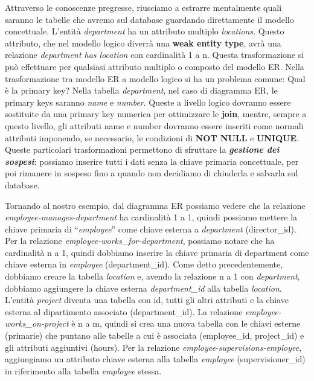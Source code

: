 Attraverso le conoscenze pregresse, riusciamo a estrarre mentalmente quali saranno le tabelle che avremo sul database guardando direttamente il modello concettuale.  
L’entità \textit{department} ha un attributo multiplo \textit{locations}. Questo attributo, che nel modello logico diverrà una \textbf{weak entity type}, avrà una relazione \textit{department has location} con cardinalità 1 a n. Questa trasformazione si può effettuare per qualsiasi attributo multiplo o composto del modello ER. Nella trasformazione tra modello ER a modello logico si ha un problema comune:  Qual è la primary key?  Nella tabella \textit{department}, nel caso di diagramma ER, le primary keys saranno \textit{name} e \textit{number}. Queste a livello logico dovranno essere sostituite da una primary key numerica per ottimizzare le \textbf{join}, mentre, sempre a questo livello, gli attributi name e number dovranno essere inseriti come normali attributi imponendo, se necessario, le condizioni di \textbf{NOT NULL} e \textbf{UNIQUE}. Queste particolari trasformazioni permettono di sfruttare la \textit{\textbf{gestione dei sospesi}}: possiamo inserire tutti i dati senza la chiave primaria concettuale, per poi rimanere in sospeso fino a quando non decidiamo di chiuderla e salvarla sul database.  

Tornando al nostro esempio, dal diagramma ER possiamo vedere che la relazione \textit{employee-manages-department} ha cardinalità 1 a 1, quindi possiamo mettere la chiave primaria di “\textit{employee}” come chiave esterna a \textit{department} (director\_id). Per la relazione \textit{employee-works\_for-department}, possiamo notare che ha cardinalità n a 1, quindi dobbiamo inserire la chiave primaria di department come chiave esterna in \textit{employee} (department\_id). Come detto precedentemente, dobbiamo creare la tabella \textit{location} e, avendo la relazione n a 1 con \textit{department}, dobbiamo aggiungere la chiave esterna \textit{department\_id} alla tabella \textit{location}. L’entità \textit{project} diventa una tabella con id, tutti gli altri attributi e la chiave esterna al dipartimento associato (department\_id). La relazione \textit{employee-works\_on-project} è n a m, quindi si crea una nuova tabella con le chiavi esterne (primarie) che puntano alle tabelle a cui è associata (employee\_id, project\_id) e gli attributi aggiuntivi (hours). Per la relazione \textit{employee-supervisions-employee}, aggiungiamo un attributo chiave esterna alla tabella \textit{employee} (supervisioner\_id) in riferimento alla tabella \textit{employee} stessa. 
 
